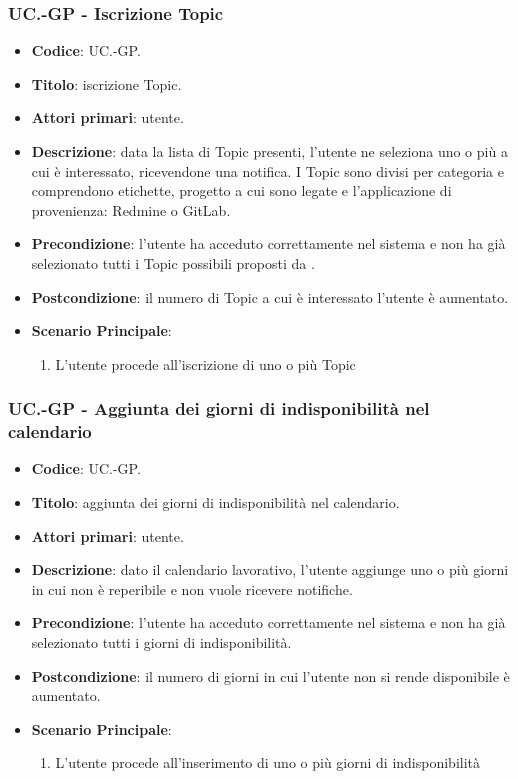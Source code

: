 	\subsubsection{UC\theuccount.\thesubuccount-GP - Iscrizione Topic}

		\begin{itemize}
			\item \textbf{Codice}: UC\theuccount.\thesubuccount-GP.
			\item \textbf{Titolo}: iscrizione Topic.
			\item \textbf{Attori primari}: utente.
			\item \textbf{Descrizione}: data la lista di Topic presenti, l’utente ne seleziona uno o	più a cui è interessato, ricevendone una notifica. I Topic sono divisi per categoria e	comprendono etichette, progetto a cui sono legate e l'applicazione di provenienza: Redmine o GitLab.
			\item \textbf{Precondizione}: l’utente ha acceduto correttamente nel sistema e non ha già selezionato tutti i Topic possibili proposti da \progetto.
			\item \textbf{Postcondizione}: il numero di Topic a cui è interessato l’utente è aumentato.
			\item \textbf{Scenario Principale}:
			\begin{enumerate}
				\item L'utente procede all'iscrizione di uno o più Topic
			\end{enumerate}
		\end{itemize}
	
	\subsubsection{UC\theuccount.\thesubuccount-GP - Aggiunta dei giorni di indisponibilità nel calendario}
		
		\begin{itemize}
			\item \textbf{Codice}: UC\theuccount.\thesubuccount-GP.
			\item \textbf{Titolo}: aggiunta dei giorni di indisponibilità nel calendario.
			\item \textbf{Attori primari}: utente.
			\item \textbf{Descrizione}: dato il calendario lavorativo, l’utente aggiunge uno o più giorni in cui non è reperibile e non vuole ricevere notifiche.
			\item \textbf{Precondizione}: l’utente ha acceduto correttamente nel sistema e non ha già selezionato tutti i giorni di indisponibilità.
			\item \textbf{Postcondizione}: il numero di giorni in cui l’utente non si rende disponibile è aumentato.
			\item \textbf{Scenario Principale}:
			\begin{enumerate}
				\item L'utente procede all'inserimento di uno o più giorni di indisponibilità
			\end{enumerate}
		\end{itemize}
	
